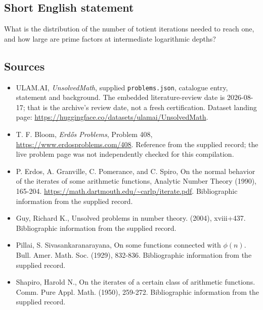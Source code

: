 \documentclass[11pt,a4paper]{article}
\begin{document}
\subsection{Short English statement}

What is the distribution of the number of totient iterations needed to reach one, and how large are prime factors at intermediate logarithmic depths?

\subsection{Sources}

{\small

\begin{itemize}

\item[\hypertarget{source:statement:1}{S1}] ULAM.AI, \emph{UnsolvedMath}, supplied \texttt{problems.json}, catalogue entry, statement and background. The embedded literature-review date is 2026-08-17; that is the archive’s review date, not a fresh certification. Dataset landing page: \url{https://huggingface.co/datasets/ulamai/UnsolvedMath}.

\item[\hypertarget{source:statement:2}{S2}] T. F. Bloom, \emph{Erdős Problems}, Problem 408, \url{https://www.erdosproblems.com/408}. Reference from the supplied record; the live problem page was not independently checked for this compilation.

\item[\hypertarget{source:statement:3}{S3}] P. Erdos, A. Granville, C. Pomerance, and C. Spiro, On the normal behavior of the iterates of some arithmetic functions, Analytic Number Theory (1990), 165-204. \url{https://math.dartmouth.edu/~carlp/iterate.pdf}. Bibliographic information from the supplied record.

\item[\hypertarget{source:statement:4}{S4}] Guy, Richard K., Unsolved problems in number theory. (2004), xviii+437. Bibliographic information from the supplied record.

\item[\hypertarget{source:statement:5}{S5}] Pillai, S. Sivasankaranarayana, On some functions connected with {$\phi(n)$}. Bull. Amer. Math. Soc. (1929), 832-836. Bibliographic information from the supplied record.

\item[\hypertarget{source:statement:6}{S6}] Shapiro, Harold N., On the iterates of a certain class of arithmetic functions. Comm. Pure Appl. Math. (1950), 259-272. Bibliographic information from the supplied record.

\end{itemize}

}

\label{end:statement}
\end{document}
